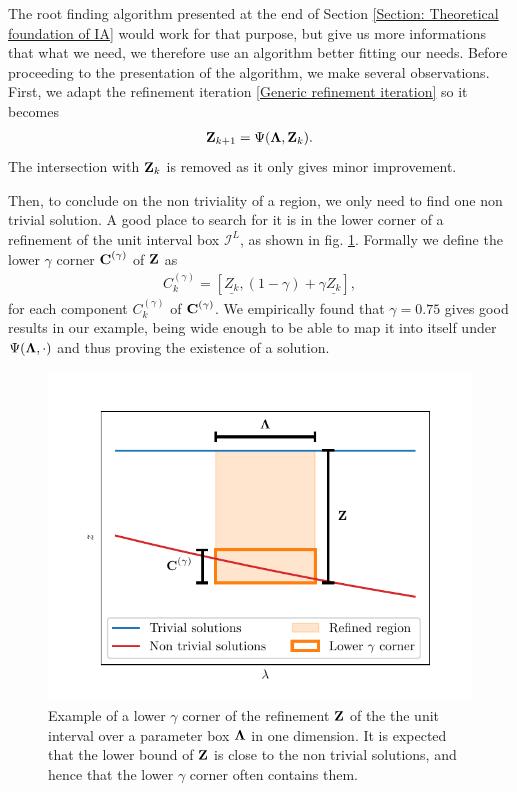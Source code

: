 \documentclass[
11pt, %
english, %
singlespacing, %
nolistspacing, %
liststotoc, %
headsepline, %
]{MastersDoctoralThesis} %
\begin{document}
The root finding algorithm presented at the end of Section \ref{Section: Theoretical foundation of IA} would work for that purpose, but give us more informations that what we need, we therefore use an algorithm better fitting our needs. Before proceeding to the presentation of the algorithm, we make several observations. First, we adapt the refinement iteration \eqref{Generic refinement iteration} so it becomes
\begin{align}
	\boldsymbol{\mathrm{Z}}_{k+1} = \Psi(\boldsymbol{\mathrm{\Lambda}}, \boldsymbol{\mathrm{Z}}_k). \label{Fixpoint refinement}
\end{align}
The intersection with $\boldsymbol{\mathrm{Z}}_k$ is removed as it only gives minor improvement.

Then, to conclude on the non triviality of a region, we only need to find one non trivial solution. A good place to search for it is in the lower corner of a refinement of the unit interval box $\mathcal{I}^L$, as shown in fig. \ref{Figure: Lower corner}. Formally we define the lower $\gamma$ corner $\boldsymbol{\mathrm{C}}^{(\gamma)}$ of $\boldsymbol{\mathrm{Z}}$ as
\begin{align}
	C^{(\gamma)}_k = \left[ \underline{Z_k}, (1 - \gamma) + \gamma \underline{Z_k} \right],
\end{align}
for each component $C^{(\gamma)}_k$ of $\boldsymbol{\mathrm{C}}^{(\gamma)}$. We empirically found that $\gamma = 0.75$ gives good results in our example, being wide enough to be able to map it into itself under $\Psi(\boldsymbol{\mathrm{\Lambda}}, \cdot)$ and thus proving the existence of a solution.

\begin{figure}
	\includegraphics[scale=0.8]{lower_corner.pdf}
	\caption{Example of a lower $\gamma$ corner of the refinement $\boldsymbol{\mathrm{Z}}$ of the the unit interval over a parameter box $\boldsymbol{\mathrm{\Lambda}}$ in one dimension. It is expected that the lower bound of $\boldsymbol{\mathrm{Z}}$ is close to the non trivial solutions, and hence that the lower $\gamma$ corner often contains them.}
	\label{Figure: Lower corner}
\end{figure}
\end{document}
